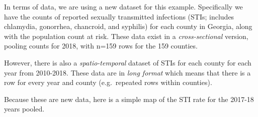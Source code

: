 \documentclass[
]{book}
\newenvironment{Shaded}{\begin{snugshade}}{\end{snugshade}}
\newcommand{\CommentTok}[1]{\textcolor[rgb]{0.56,0.35,0.01}{\textit{#1}}}
\newcommand{\FunctionTok}[1]{\textcolor[rgb]{0.13,0.29,0.53}{\textbf{#1}}}
\newcommand{\NormalTok}[1]{#1}
\newcommand{\OtherTok}[1]{\textcolor[rgb]{0.56,0.35,0.01}{#1}}
\newcommand{\SpecialCharTok}[1]{\textcolor[rgb]{0.81,0.36,0.00}{\textbf{#1}}}
\newcommand{\StringTok}[1]{\textcolor[rgb]{0.31,0.60,0.02}{#1}}
\begin{document}
In terms of data, we are using a new dataset for this example. Specifically we have the counts of reported sexually transmitted infections (STIs; includes chlamydia, gonorrhea, chancroid, and syphilis) for each county in Georgia, along with the population count at risk. These data exist in a \emph{cross-sectional} version, pooling counts for 2018, with n=159 rows for the 159 counties.

However, there is also a \emph{spatio-temporal} dataset of STIs for each county for each year from 2010-2018. These data are in \emph{long format} which means that there is a row for every year and county (e.g.~repeated rows within counties).

\begin{Shaded}
\end{Shaded}

Because these are new data, here is a simple map of the STI rate for the 2017-18 years pooled.
\end{document}
